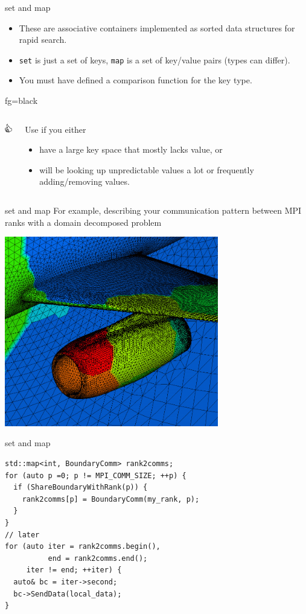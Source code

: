 \documentclass[presentation,t]{beamer}
\newcommand{\code}[1]{\lstinline!#1!}
\newcommand{\thumb}[1]{
  \vfill{}
  \begin{beamercolorbox}{fg=black}
    \begin{columns}[c,onlytextwidth]
      \begin{column}{0.07\textwidth}
        \includegraphics[width=1em]{thumbs_up}
      \end{column}
      \begin{column}{0.93\textwidth}
        #1
      \end{column}
    \end{columns}
  \end{beamercolorbox}
}
\begin{document}
\begin{frame}{set and map}
  \begin{itemize}
  \item These are associative containers implemented as sorted data
    structures for rapid search.

  \item \code{set} is just a set of keys, \code{map} is a set of
    key/value pairs (types can differ).
  
  \item You must have defined a comparison function for the key type.
  \end{itemize}
  
  \thumb{Use if you either 
    \begin{itemize}
      \item have a large key space that mostly lacks value, or
      \item will be looking up unpredictable values a lot or
        frequently adding/removing values.
      \end{itemize}
    }
\end{frame}

\begin{frame}{set and map}
  For example, describing your communication pattern between MPI ranks
  with a domain decomposed problem
  \begin{center}
  \includegraphics[width=0.7\textwidth]{domain_decomp}
\end{center}
\end{frame}

\begin{frame}[fragile]{set and map}
\begin{lstlisting}
std::map<int, BoundaryComm> rank2comms;
for (auto p =0; p != MPI_COMM_SIZE; ++p) {
  if (ShareBoundaryWithRank(p)) {
    rank2comms[p] = BoundaryComm(my_rank, p);
  }
}
// later
for (auto iter = rank2comms.begin(),
          end = rank2comms.end();
     iter != end; ++iter) {
  auto& bc = iter->second;
  bc->SendData(local_data);
}
\end{lstlisting}
\end{frame}
\end{document}
